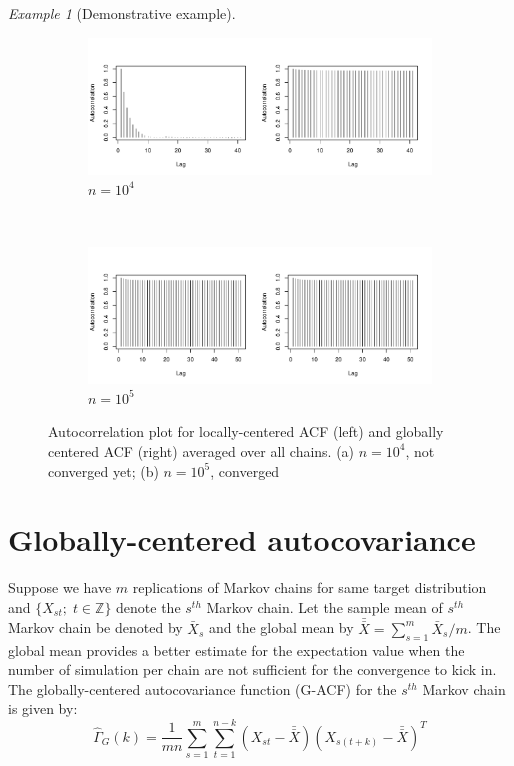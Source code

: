 \documentclass[11pt]{article}
\theoremstyle{remark}
\newtheorem{example}{Example}
\begin{document}
\begin{example}[Demonstrative example]
\begin{figure}[htbp]
\begin{subfigure}{\textwidth}
   \centering
   \includegraphics[width=.8\linewidth]{plots/gaussian-acf_n1e4.pdf}
   \caption{$n = 10^4$}
   \label{subfig:gauss-acf-1e4}
 \end{subfigure}\\
 \begin{subfigure}{\textwidth}
   \centering
   \includegraphics[width=.8\linewidth]{plots/gaussian-acf_n1e5.pdf} 
   \caption{$n = 10^5$}
   \label{subfig:gauss-acf-1e5}
 \end{subfigure}
 \caption{Autocorrelation plot for locally-centered ACF (left) and globally centered ACF (right) averaged over all chains. (a) $n = 10^4$, not converged yet; (b) $n =  10^5$, converged}
 \label{fig:gauss:acf}
\end{figure}
\end{example}



\section{Globally-centered autocovariance} \label{sec:G-ACF}

 Suppose we have $m$ replications of Markov chains for same target distribution and $\{X_{st}; \; t \in \mathbb{Z}\}$ denote the $s^{th}$ Markov chain. Let the sample mean of $s^{th}$ Markov chain be denoted by $\bar{X}_s$ and the global mean by $\bar{\bar{X}} = \sum_{s = 1}^{m}\bar{X}_s/m$. The global mean provides a better estimate for the expectation value when the number of simulation per chain are not sufficient for the convergence to kick in. The globally-centered autocovariance function (G-ACF) for the $s^{th}$ Markov chain is given by:
%
\[
\hat{\Gamma}_{G}(k) = \dfrac{1}{mn} \sum_{s=1}^{m}\sum_{t=1}^{n-k}(X_{st}-\bar{\bar{X}})(X_{s(t+k)}-\bar{\bar{X}})^T
\]
\end{document}
